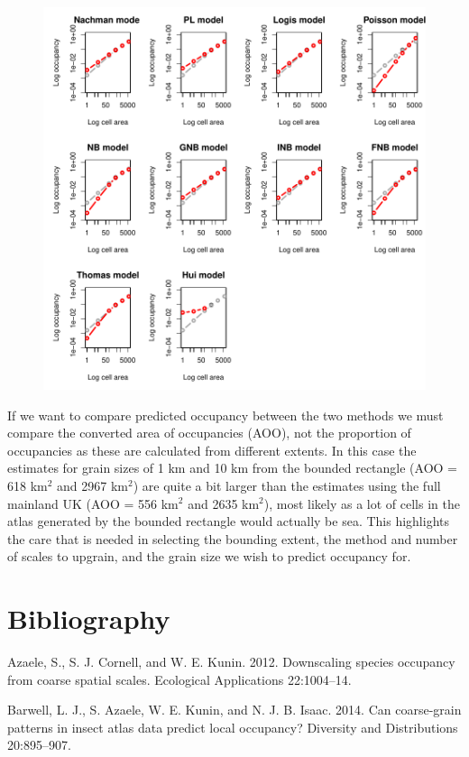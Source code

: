 \documentclass{article}[12pt, a4paper]
\begin{document}
\begin{figure}[!ht]
\centering
\includegraphics[width=\linewidth]{Downscaling-downscale42}
\end{figure}

If we want to compare predicted occupancy between the two methods we must compare the converted area of occupancies (AOO), not the proportion of occupancies as these are calculated from different extents. In this case the estimates for grain sizes of 1 km and 10 km from the bounded rectangle (AOO = 618 km$^2$ and 2967 km$^2$) are quite a bit larger than the estimates using the full mainland UK (AOO = 556 km$^2$ and 2635 km$^2$), most likely as a lot of cells in the atlas generated by the bounded rectangle would actually be sea. This highlights the care that is needed in selecting the bounding extent, the method and number of scales to upgrain, and the grain size we wish to predict occupancy for.

\section{Bibliography}

Azaele, S., S. J. Cornell, and W. E. Kunin. 2012. Downscaling species occupancy from coarse spatial scales. Ecological Applications 22:1004–14.

Barwell, L. J., S. Azaele, W. E. Kunin, and N. J. B. Isaac. 2014. Can coarse-grain patterns in insect atlas data predict local occupancy? Diversity and Distributions 20:895–907.
\end{document}

